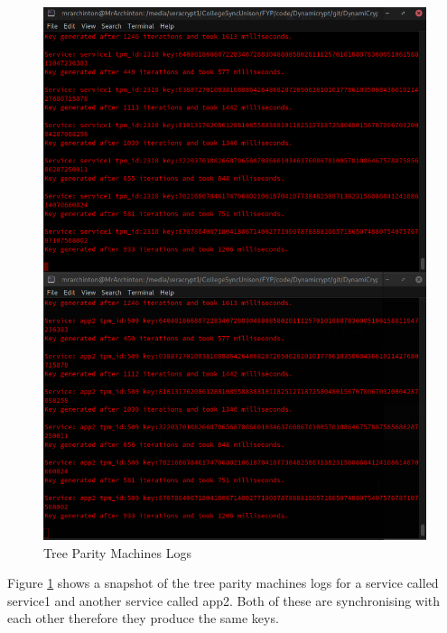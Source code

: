 \begin{figure}[!h]
  \centering
      \includegraphics[width=1\textwidth]{Figures/proto2-final.png}
  \caption[Tree Parity Machines Logs]{Tree Parity Machines Logs}
  \label{fig:proto2-final}
\end{figure}
\FloatBarrier

Figure \ref{fig:proto2-final} shows a snapshot of the tree parity machines logs for a service called service1 and another service called app2. Both of these are synchronising with each other therefore they produce the same keys.  

